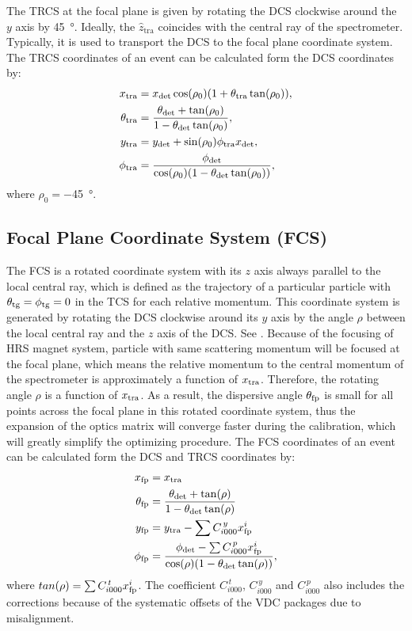 The TRCS at the focal plane is given by rotating the DCS clockwise around the $y$ axis by \SI{45}{\degree}. Ideally, the $\hat{z}_{\mathrm{tra}}$ coincides with the central ray of the spectrometer. Typically, it is used to transport the DCS to the focal plane coordinate system. The TRCS coordinates of an event can be calculated form the DCS coordinates by:
\begin{align} \label{C6S1E1}
x_{\mathrm{tra}} & = x_{\mathrm{det}}\cos(\rho_0)(1+\theta_{\mathrm{tra}}\tan(\rho_0)), \\  \label{C6S1E2}
\theta_{\mathrm{tra}} & = \frac{\theta_{\mathrm{det}}+\tan(\rho_0)}{1-\theta_{\mathrm{det}}\tan(\rho_0)}, \\  \label{C6S1E3}
y_{\mathrm{tra}} & = y_{\mathrm{det}}+\sin(\rho_0)\phi_{\mathrm{tra}}x_{\mathrm{det}}, \\ \label{C6S1E4}
\phi_{\mathrm{tra}} & = \frac{\phi_{\mathrm{det}}}{\cos(\rho_0)(1-\theta_{\mathrm{det}}\tan(\rho_0))},
\end{align}
where $\rho_0=-$\SI{45}{\degree}.

\subsection[Focal Plane Coordinate System]{Focal Plane Coordinate System (FCS)}

The FCS is a rotated coordinate system with its $z$ axis always parallel to the local central ray, which is defined as the trajectory of a particular particle with $\theta_{\mathrm{tg}}=\phi_{\mathrm{tg}}=0$ in the TCS for each relative momentum. This coordinate system is generated by rotating the DCS clockwise around its $y$ axis by the angle $\rho$ between the local central ray and the $z$ axis of the DCS. See . Because of the focusing of HRS magnet system, particle with same scattering momentum will be focused at the focal plane, which means the relative momentum to the central momentum of the spectrometer is approximately a function of $x_{\mathrm{tra}}$. Therefore, the rotating angle $\rho$ is a function of $x_{\mathrm{tra}}$. As a result, the dispersive angle $\theta_{\mathrm{fp}}$ is small for all points across the focal plane in this rotated coordinate system, thus the expansion of the optics matrix will converge faster during the calibration, which will greatly simplify the optimizing procedure. The FCS coordinates of an event can be calculated form the DCS and TRCS coordinates by:
\begin{align} \label{C6S1E5}
x_{\mathrm{fp}} & = x_{\mathrm{tra}} \\ \label{C6S1E6}
\theta_{\mathrm{fp}} & = \frac{\theta_{\mathrm{det}}+\tan(\rho)}{1-\theta_{\mathrm{det}}\tan(\rho)} \\ \label{C6S1E7}
y_{\mathrm{fp}} & = y_{\mathrm{tra}}-\sum C_{i000}^{\,y} x_{\mathrm{fp}}^i \\ \label{C6S1E8}
\phi_{\mathrm{fp}} & = \frac{\phi_{\mathrm{det}}-\sum C_{i000}^{\,p}x_{\mathrm{fp}}^i}{\cos(\rho)(1-\theta_{\mathrm{det}}\tan(\rho))},
\end{align}
where $tan(\rho) = \sum C_{i000}^{\,t} x_{\mathrm{fp}}^i$. The coefficient $C_{i000}^{\,t}$, $C_{i000}^{\,y}$ and $C_{i000}^{\,p}$ also includes the corrections because of the systematic offsets of the VDC packages due to misalignment.


